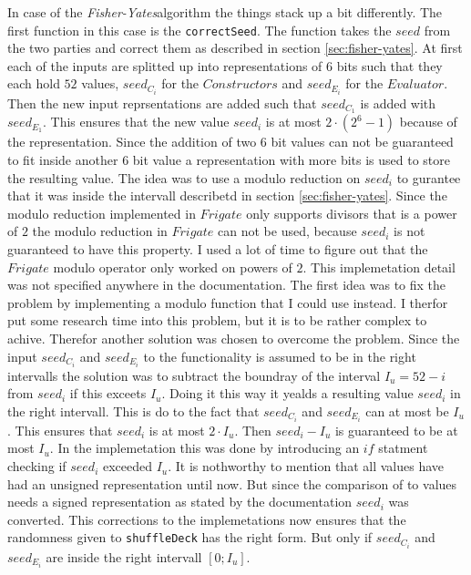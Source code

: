 \documentclass[twoside,11pt,openright]{report}
\newcommand{\FY}{\textit{Fisher-Yates}}
\begin{document}
In case of the \FY algorithm the things stack up a bit differently. The first function in this case is the \verb|correctSeed|. The function takes the $seed$ from the two parties and correct them as described in section \ref{sec:fisher-yates}. At first each of the inputs are splitted up into representations of $6$ bits such that they each hold $52$ values, $seed_{C_i}$ for the $Constructors$ and $seed_{E_i}$ for the $Evaluator$. Then the new input reprsentations are added such that $seed_{C_1}$ is added with $seed_{E_1}$. This ensures that the new value $seed_i$ is at most $2\cdot (2^6 - 1)$ because of the representation. Since the addition of two $6$ bit values can not be guaranteed to fit inside another $6$ bit value a representation with more bits is used to store the resulting value.
The idea was to use a modulo reduction on $seed_i$ to gurantee that it was inside the intervall describetd in section \ref{sec:fisher-yates}. Since the modulo reduction implemented in $Frigate$ only supports divisors that is a power of $2$ the modulo reduction in $Frigate$ can not be used, because $seed_i$ is not guaranteed to have this property. I used a lot of time to figure out that the $Frigate$ modulo operator only worked on powers of $2$. This implemetation detail was not specified anywhere in the documentation. The first idea was to fix the problem by implementing a modulo function that I could use instead. I therfor put some research time into this problem, but it is to be rather complex to achive. Therefor another solution was chosen to overcome the problem. Since the input $seed_{C_i}$ and $seed_{E_i}$ to the functionality is assumed to be in the right intervalls the solution was to subtract the boundray of the interval $I_u=52-i$ from $seed_i$ if this exceets $I_u$. Doing it this way it yealds a resulting value $seed_i$ in the right intervall. This is do to the fact that $seed_{C_i}$ and $seed_{E_i}$ can at most be $I_u$. This ensures that $seed_i$ is at most $2\cdot I_u$. Then $seed_i - I_u$ is guaranteed to be at most $I_u$.
In the implemetation this was done by introducing an $if$ statment checking if $seed_i$ exceeded $I_u$. It is nothworthy to mention that all values have had an unsigned representation until now. But since the comparison of to values needs a signed representation as stated by the documentation $seed_i$ was converted. This corrections to the implemetations now ensures that the randomness given to \verb|shuffleDeck| has the right form. But only if $seed_{C_i}$ and $seed_{E_i}$ are inside the right intervall $[0;I_u]$.
\end{document}
